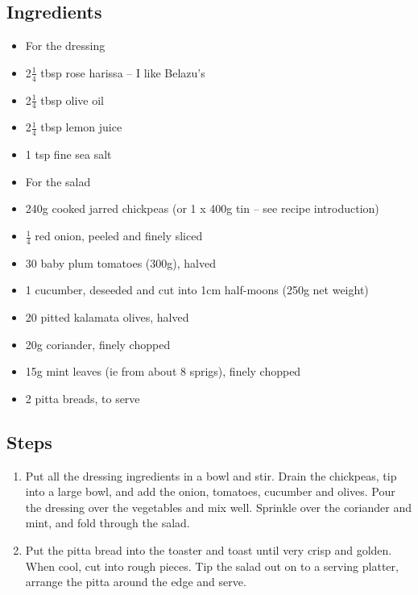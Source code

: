 \documentclass{book}
\begin{document}
\subsection*{Ingredients}
\begin{itemize}
\item For the dressing 
\item 2$\frac{1}{4}$ tbsp rose harissa – I like Belazu’s
\item 2$\frac{1}{4}$ tbsp olive oil 
\item 2$\frac{1}{4}$ tbsp lemon juice
\item 1 tsp fine sea salt
\end{itemize}

\begin{itemize}
\item For the salad
\item 240g cooked jarred chickpeas (or 1 x 400g tin – see recipe introduction) 
\item $\frac{1}{4}$ red onion, peeled and finely sliced 
\item 30 baby plum tomatoes (300g), halved 
\item 1 cucumber, deseeded and cut into 1cm half-moons (250g net weight)
\item 20 pitted kalamata olives, halved 
\item 20g coriander, finely chopped 
\item 15g mint leaves (ie from about 8 sprigs), finely chopped 
\item 2 pitta breads, to serve
\end{itemize}

\subsection*{Steps}
\begin{enumerate}
\item Put all the dressing ingredients in a bowl and stir. Drain the chickpeas, tip into a large bowl, and add the onion, tomatoes, cucumber and olives. Pour the dressing over the vegetables and mix well. Sprinkle over the coriander and mint, and fold through the salad.
\item Put the pitta bread into the toaster and toast until very crisp and golden. When cool, cut into rough pieces. Tip the salad out on to a serving platter, arrange the pitta around the edge and serve.
\end{enumerate}
\newpage
\end{document}

